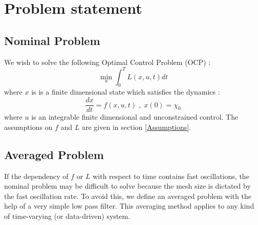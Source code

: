 \documentclass[a4paper,10pt]{article}
\begin{document}
\section{Problem statement}\label{settingssec}
\subsection{Nominal Problem}\label{NominalProblem}
We wish to solve the following Optimal Control Problem (OCP) :
\begin{equation}
    \min_{u}\int_{0}^{T}L(x,u,t)dt
    \label{cost}
\end{equation}
where $x$ is is a finite dimensional state which satisfies the 
dynamics :
\begin{equation}
    \frac{dx}{dt}=f(x,u,t) \; , \; x(0)=\chi_{0}
    \label{dynamics}
\end{equation}
where $u$ is an integrable finite dimensional and unconstrained control.
The assumptions on $f$ and $L$ are given in section \ref{Assumptions}.

\subsection{Averaged Problem}
If the dependency of $f$ or $L$ with respect 
to time contains fast oscillations, the nominal problem may be 
difficult to solve because the mesh size is dictated by the fast 
oscillation rate. To avoid this, we define an averaged problem with 
the help of a very simple low pass filter.
This averaging method applies to any kind of time-varying (or 
data-driven) system.
\end{document}
